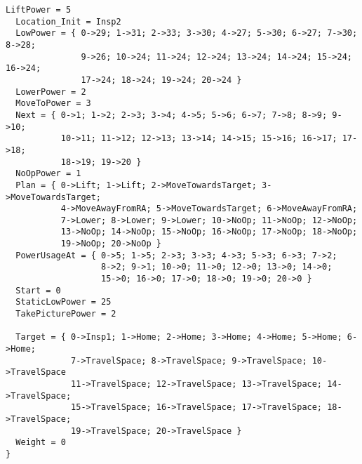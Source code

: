 \documentclass[12pt]{extarticle}
\begin{document}
\begin{lstlisting}[basicstyle=\tiny]
  LiftPower = 5
  Location_Init = Insp2
  LowPower = { 0->29; 1->31; 2->33; 3->30; 4->27; 5->30; 6->27; 7->30; 8->28;
               9->26; 10->24; 11->24; 12->24; 13->24; 14->24; 15->24; 16->24;
               17->24; 18->24; 19->24; 20->24 }
  LowerPower = 2
  MoveToPower = 3
  Next = { 0->1; 1->2; 2->3; 3->4; 4->5; 5->6; 6->7; 7->8; 8->9; 9->10;
           10->11; 11->12; 12->13; 13->14; 14->15; 15->16; 16->17; 17->18;
           18->19; 19->20 }
  NoOpPower = 1
  Plan = { 0->Lift; 1->Lift; 2->MoveTowardsTarget; 3->MoveTowardsTarget;
           4->MoveAwayFromRA; 5->MoveTowardsTarget; 6->MoveAwayFromRA;
           7->Lower; 8->Lower; 9->Lower; 10->NoOp; 11->NoOp; 12->NoOp;
           13->NoOp; 14->NoOp; 15->NoOp; 16->NoOp; 17->NoOp; 18->NoOp;
           19->NoOp; 20->NoOp }
  PowerUsageAt = { 0->5; 1->5; 2->3; 3->3; 4->3; 5->3; 6->3; 7->2;
                   8->2; 9->1; 10->0; 11->0; 12->0; 13->0; 14->0;
                   15->0; 16->0; 17->0; 18->0; 19->0; 20->0 }
  Start = 0
  StaticLowPower = 25
  TakePicturePower = 2
  
  Target = { 0->Insp1; 1->Home; 2->Home; 3->Home; 4->Home; 5->Home; 6->Home;
             7->TravelSpace; 8->TravelSpace; 9->TravelSpace; 10->TravelSpace
             11->TravelSpace; 12->TravelSpace; 13->TravelSpace; 14->TravelSpace;
             15->TravelSpace; 16->TravelSpace; 17->TravelSpace; 18->TravelSpace;
             19->TravelSpace; 20->TravelSpace }
  Weight = 0
}
\end{lstlisting}
\end{document}
